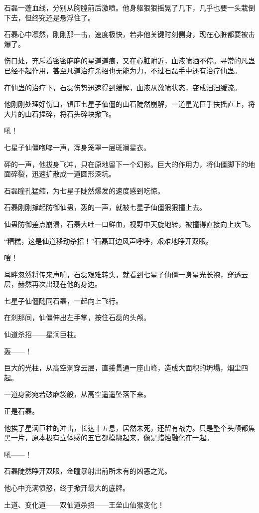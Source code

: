 \begin{this_body}
石磊一蓬血线，分别从胸膛前后激喷。他身躯狠狠摇晃了几下，几乎也要一头栽倒下去，但终究还是悬浮住了。

石磊心中凛然，刚刚那一击，速度极快，若非他关键时刻侧身，现在心脏都要被击爆了。

伤口处，充斥着密密麻麻的星道道痕，又在心脏附近，血液喷洒不停。寻常的凡蛊已经不起作用，甚至凡道治疗杀招也无能为力，不过石磊手中还有治疗仙蛊。

在仙蛊的治疗下，石磊伤势迅速得到缓解，血液从激喷状态，变成汩汩缓流。

他刚刚处理好伤口，镇压七星子仙僵的山石陡然崩解，一道星光巨手扶摇直上，将大片的山石捏碎，将石头碎块掀飞。

吼！

七星子仙僵咆哮一声，浑身笼罩一层斑斓星衣。

砰的一声，他拔身飞冲，只在原地留下一个幻影。巨大的作用力，将仙僵脚下的地面碎裂，迅速扩散成一道圆形深坑。

石磊瞳孔猛缩，为七星子陡然爆发的速度感到吃惊。

石磊刚刚撑起防御仙蛊，轰的一声，就被七星子仙僵狠狠撞上去。

仙蛊防御差点崩溃，石磊大吐一口鲜血，视野中天旋地转，被撞得直接向上疾飞。

“糟糕，这是仙道移动杀招！”石磊耳边风声呼呼，艰难地睁开双眼。

嗖！

耳畔忽然将传来声响，石磊艰难转头，就看到七星子仙僵一身星光长袍，穿透云层，赫然再次出现在他的身边。

七星子仙僵随同石磊，一起向上飞行。

在刹那间，仙僵伸出左手掌，按住石磊的头颅。

仙道杀招——星澜巨柱。

轰——！

巨大的光柱，从高空洞穿云层，直接贯通一座山峰，造成大面积的坍塌，烟尘四起。

一道身影宛若破麻袋般，从高空遥遥坠落下来。

正是石磊。

他挨了星澜巨柱的冲击，长达十五息，居然未死，还留有战力。只是整个头颅都焦黑一片，原本极有立体感的五官都模糊起来，像是蜡烛融化在一起。

吼——！

石磊陡然睁开双眼，金瞳暴射出前所未有的凶恶之光。

他心中充满愤怒，终于掀开最大的底牌。

土道、变化道——双仙道杀招——王垒山仙猴变化！


\end{this_body}
